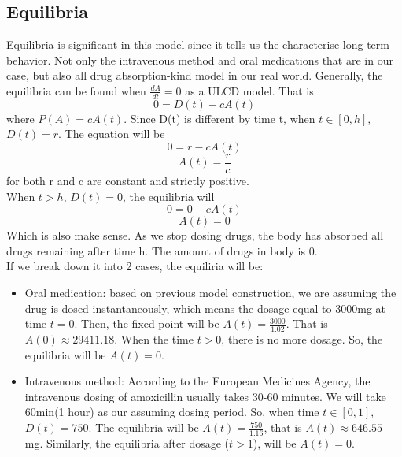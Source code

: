 \documentclass{article}
\begin{document}
\subsection*{Equilibria}
Equilibria is significant in this model since it tells us the characterise long-term behavior. Not only the intravenous method and oral medications that are in our case, but also all drug absorption-kind model in our real world. 
Generally, the equilibria can be found when $\frac{dA}{dt} = 0$ as a ULCD model. That is $$0 = D(t) - cA(t)$$ where $P(A) = cA(t)$. Since D(t) is different by time t, when $t \in [0,h]$, $D(t) = r$. The equation will be $$0 = r - cA(t)$$ $$A(t) = \frac{r}{c}$$ for both r and c are constant and strictly positive. \\When $t > h$, $D(t) = 0$, the equilibria will $$0 = 0 - cA(t)$$ $$A(t) = 0$$ Which is also make sense. As we stop dosing drugs, the body has absorbed all drugs remaining after time h. The amount of drugs in body is 0.\\
If we break down it into 2 cases, the equiliria will be:
\begin{itemize}
    \item Oral medication: based on previous model construction, we are assuming the drug is dosed instantaneously, which means the dosage equal to 3000mg at time $t = 0$. Then, the fixed point will be $A(t) = \frac{3000}{1.02}$. That is $A(0)  \approx 29411.18$. When the time $t>0$, there is no more dosage. So, the equilibria will be $A(t) = 0$.\\
    \item Intravenous method: According to the European Medicines Agency, the intravenous dosing of amoxicillin usually takes 30-60 minutes. We will take 60min(1 hour) as our assuming dosing period. So, when time $t \in [0,1]$, $D(t) = 750$. The equilibria will be $A(t) = \frac{750}{1.16}$, that is $A(t) \approx 646.55$ mg. Similarly, the equilibria after dosage ($t > 1$), will be $A(t) = 0$.
\end{itemize}
\end{document}
